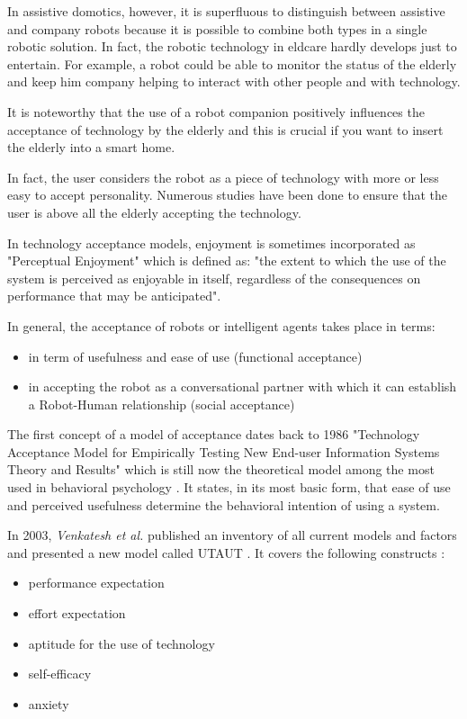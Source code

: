 \documentclass{thesisreport}
\begin{document}
 In assistive domotics, however, it is superfluous to distinguish between assistive and company robots because it is possible to combine both types in a single robotic solution. In fact, the robotic technology in eldcare hardly develops just to entertain.
 For example, a robot could be able to monitor the status of the elderly and keep him company helping to interact with other people and with technology.
 
 It is noteworthy that the use of a robot companion positively influences the acceptance of technology by the elderly and this is crucial if you want to insert the elderly into a smart home.
 
 In fact, the user considers the robot as a piece of technology with more or less easy to accept personality.
 Numerous studies have been done to ensure that the user is above all the elderly accepting the technology.
 
 In technology acceptance models, enjoyment is sometimes incorporated as "Perceptual Enjoyment" which is defined as: "the extent to which the use of the system is perceived as enjoyable in itself, regardless of the consequences on performance that may be anticipated".
 
 In general, the acceptance of robots or intelligent agents takes place in terms:
 \begin{itemize}
     \item in term of usefulness and ease of use (functional acceptance)
     \item in accepting the robot as a conversational partner with which it can establish a Robot-Human relationship (social acceptance)
 \end{itemize}
 
 The first concept of a model of acceptance dates back to 1986 "Technology Acceptance Model for Empirically Testing New End-user Information Systems Theory and Results" which is still now the theoretical model among the most used in behavioral psychology \cite{davis1985technology,enjoymentModels}.
 It states, in its most basic form, that ease of use and perceived usefulness determine the behavioral intention of using a system.
 
 In 2003, \textit{Venkatesh et al.} published an inventory of all current models and factors and presented a new model called UTAUT \cite{venkatesh2003user,enjoymentModels}. It covers the following constructs :
 \begin{itemize}
     \item performance expectation
     \item effort expectation
     \item aptitude for the use of technology
     \item self-efficacy
     \item anxiety
 \end{itemize}
 
\end{document}
